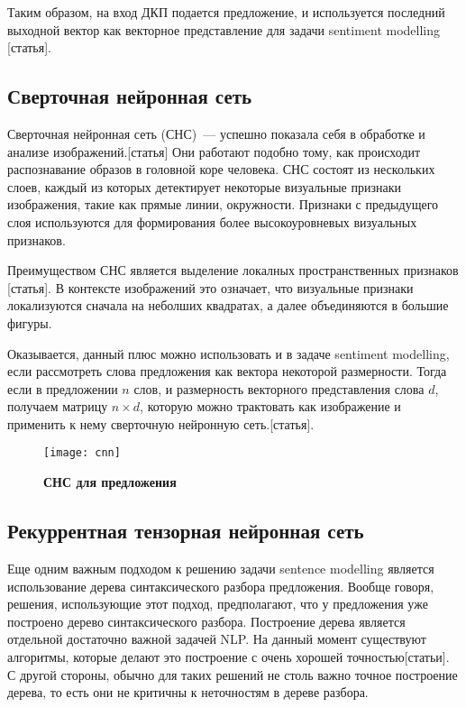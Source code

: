 Таким образом, на вход ДКП подается предложение, и используется последний выходной вектор как векторное представление для задачи sentiment modelling [статья].

\subsection{Сверточная нейронная сеть}
Сверточная нейронная сеть (СНС)~--- успешно показала себя в обработке и анализе изображений.[статья] Они работают подобно тому, как происходит распознавание образов в головной коре человека. СНС состоят из нескольких слоев, каждый из которых детектирует некоторые визуальные признаки изображения, такие как прямые линии, окружности. Признаки с предыдущего слоя используются для формирования более высокоуровневых визуальных признаков.

Преимуществом СНС является выделение локалных пространственных признаков [статья]. В контексте изображений это означает, что визуальные признаки локализуются сначала на неболших квадратах, а далее объединяются в большие фигуры.

Оказывается, данный плюс можно использовать и в задаче sentiment modelling, если рассмотреть слова предложения как вектора некоторой размерности. Тогда если в предложении $n$ слов, 
и размерность векторного представления слова $d$, получаем матрицу $n \times d$, 
которую можно трактовать как изображение и применить к нему сверточную нейронную сеть.[статья].

\begin{figure}[h]
\texttt{[image: cnn]}
\caption{\textbf{СНС для предложения}}
\label{fig:cnn}
\end{figure}

\subsection{Рекуррентная тензорная нейронная сеть}
Еще одним важным подходом к решению задачи sentence modelling является использование 
дерева синтаксического разбора предложения. Вообще говоря, решения, использующие этот подход, предполагают, что у предложения уже построено дерево синтаксического разбора. Построение дерева является отдельной достаточно важной задачей NLP. На данный момент существуют алгоритмы, которые делают это построение с очень хорошей точностью[статьи]. 
С другой стороны, обычно для таких решений не столь важно точное построение дерева, то есть они не критичны к неточностям в дереве разбора.

